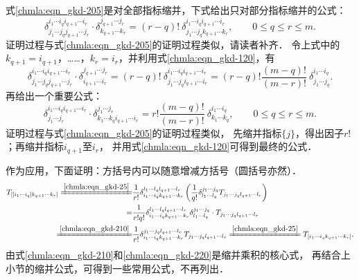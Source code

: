 式\eqref{chmla:eqn_gkd-205}是对全部指标缩并，下式给出只对部分指标缩并的公式：
\begin{equation}\label{chmla:eqn_gkd-210}
    \delta_{j_1 \cdots j_q j_{q+1}\cdots j_r}^{i_1 \cdots i_q i_{q+1}\cdots i_r}
    \cdot \delta_{k_{q+1} \cdots k_r}^{j_{q+1} \cdots j_r}
    =(r-q)! \ \delta_{j_1 \cdots j_q k_{q+1}\cdots k_r}^{i_1 \cdots i_q i_{q+1}\cdots i_r} ,
    \qquad 0 \leqslant q \leqslant r \leqslant m .
\end{equation}
证明过程与式\eqref{chmla:eqn_gkd-205}的证明过程类似，请读者补齐．
令上式中的$k_{q+1}=i_{q+1}$，……，$k_r=i_r$，并利用式\eqref{chmla:eqn_gkd-120}，有
\begin{equation}\label{chmla:eqn_gkd-215}
    \delta_{j_1 \cdots j_q j_{q+1}\cdots j_r}^{i_1 \cdots i_q i_{q+1}\cdots i_r}
    \cdot \delta_{i_{q+1} \cdots i_r}^{j_{q+1} \cdots j_r}
    =(r-q)! \ \delta_{j_1 \cdots j_q i_{q+1}\cdots i_r}^{i_1 \cdots i_q i_{q+1}\cdots i_r}
    =(r-q)! \frac{(m-q)!}{(m-r)!}  \ \delta_{j_1 \cdots j_q}^{i_1 \cdots i_q} .
\end{equation}
再给出一个重要公式：
\begin{equation}\label{chmla:eqn_gkd-220}
    \delta_{j_1 \cdots j_r}^{i_1 \cdots i_q i_{q+1}\cdots i_r}
    \cdot \delta_{k_{1}\cdots k_q i_{q+1} \cdots i_r}^{j_1  \cdots j_r}
    =r! \frac{(m-q)!}{(m-r)!}  \ \delta_{k_1 \cdots k_q}^{i_1 \cdots i_q} ,
    \qquad 0 \leqslant q \leqslant r \leqslant m .
\end{equation}
证明过程与式\eqref{chmla:eqn_gkd-205}的证明过程类似，
先缩并指标$\{j\}$，得出因子$r!$；再缩并指标$i_{q+1}$至$i_r$，
并用式\eqref{chmla:eqn_gkd-120}可得到最终的公式．


作为应用，下面证明：方括号内可以随意增减方括号（圆括号亦然）．
\begin{align*}
    T_{[[i_1 \cdots i_q] k_{q+1}\cdots k_{r}]} \xlongequal{\ref{chmla:eqn_gkd-25}}&
    \frac{1}{r!}    \delta_{i_1 \cdots i_q k_{q+1}\cdots k_{r} }^{l_1 \cdots l_q l_{q+1}\cdots l_r}
      \left( \frac{1}{q!}\delta_{l_1 \cdots l_q}^{j_1 \cdots j_q}
      T_{j_1 \cdots j_q l_{q+1}\cdots l_{r}}\right)   \\
     =&\frac{1}{r! q!}    \delta_{i_1 \cdots i_q k_{q+1}\cdots k_{r} }^{l_1 \cdots l_q l_{q+1}\cdots l_r}
    \delta_{l_1 \cdots l_q}^{j_1 \cdots j_q} \cdot  T_{j_1 \cdots j_q l_{q+1}\cdots l_{r}}  \\
    \xlongequal{\ref{chmla:eqn_gkd-210}}&
    \frac{1}{r!}  \delta_{i_1 \cdots i_q k_{q+1}\cdots k_{r} }^{j_1 \cdots j_q l_{q+1}\cdots l_r}
    T_{j_1 \cdots j_q l_{q+1}\cdots l_{r}} 
    \xlongequal{\ref{chmla:eqn_gkd-25}}     T_{[i_1 \cdots i_q k_{q+1}\cdots k_{r}]} .
\end{align*}
由式\eqref{chmla:eqn_gkd-210}和\eqref{chmla:eqn_gkd-220}是缩并乘积的核心式，
再结合上小节的缩并公式，可得到一些常用公式，不再列出．

